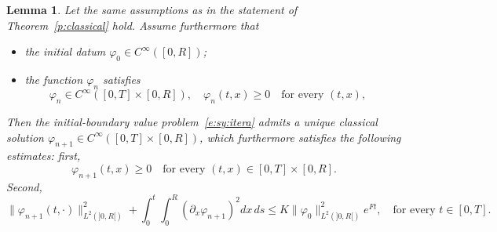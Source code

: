 \documentclass[11pt,leqno]{amsart}
\newtheorem{lemma}[theorem]{Lemma}
\numberwithin{equation}{section}
\begin{document}
\begin{lemma}
\label{l:iteration} 
Let the same assumptions as in the statement of Theorem~\ref{p:classical}  
hold. Assume furthermore that 
\begin{itemize}
\item the initial datum $\varphi_0 \in  C^\infty ([0, R])$; 
\item the function $\varphi_n$ satisfies  
\begin{equation}
\label{e:hypphienne}
       \varphi_n \in  C^\infty  ([0, T] \times [0, R]), \quad 
       \varphi_n (t, x) \ge 0 \quad \text{for every $(t, x)$}, \quad         
\end{equation}
\end{itemize}
Then the initial-boundary value problem~\eqref{e:sy:itera} admits a unique classical solution 
${ \varphi_{n+1} \in  C^\infty  ([0, T] \times [0, R])}$, which furthermore 
 satisfies the following estimates: first, 
\begin{equation}
\label{e:maxprink}
  {\varphi}_{n+1} (t, x) \ge 0 
  \quad \text{for every $(t, x)\in [0, T] \times [0, R]$.} 
\end{equation}
Second, 
\begin{equation}
\label{e:elleduek}
   \| \varphi_{n+1}(t, \cdot) \|^2 
   _{L^2(]0, R[) } +  \int_0^{t} \int_0^R (\partial_x \varphi_{n+1})^2 
   dx \, ds     \leq K \| \varphi_0 \|^2_{L^2(]0, R[) } e^{F t},   
   \quad \text{for every $t \in [0, T]$.}
\end{equation} 
\end{lemma} 
\end{document}
